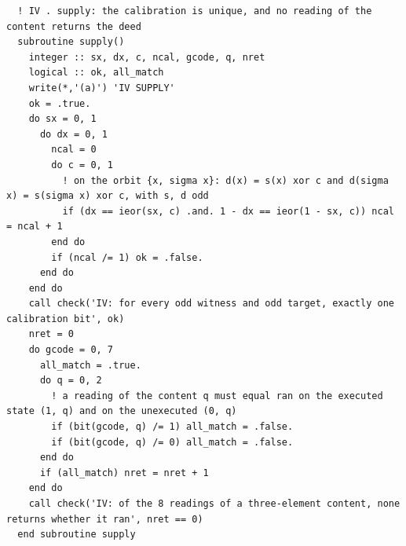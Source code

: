 \documentclass[10pt,twocolumn]{article}
\begin{document}
\begin{Verbatim}
  ! IV . supply: the calibration is unique, and no reading of the content returns the deed
  subroutine supply()
    integer :: sx, dx, c, ncal, gcode, q, nret
    logical :: ok, all_match
    write(*,'(a)') 'IV SUPPLY'
    ok = .true.
    do sx = 0, 1
      do dx = 0, 1
        ncal = 0
        do c = 0, 1
          ! on the orbit {x, sigma x}: d(x) = s(x) xor c and d(sigma x) = s(sigma x) xor c, with s, d odd
          if (dx == ieor(sx, c) .and. 1 - dx == ieor(1 - sx, c)) ncal = ncal + 1
        end do
        if (ncal /= 1) ok = .false.
      end do
    end do
    call check('IV: for every odd witness and odd target, exactly one calibration bit', ok)
    nret = 0
    do gcode = 0, 7
      all_match = .true.
      do q = 0, 2
        ! a reading of the content q must equal ran on the executed state (1, q) and on the unexecuted (0, q)
        if (bit(gcode, q) /= 1) all_match = .false.
        if (bit(gcode, q) /= 0) all_match = .false.
      end do
      if (all_match) nret = nret + 1
    end do
    call check('IV: of the 8 readings of a three-element content, none returns whether it ran', nret == 0)
  end subroutine supply


\end{Verbatim}
\end{document}
